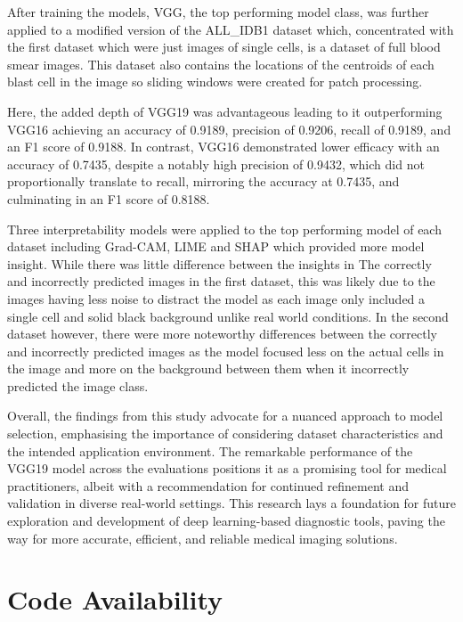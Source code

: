 \documentclass[
	a4paper,
	10pt,
	unnumberedsections,
	twoside,
]{research_article}
\begin{document}
After training the models, VGG, the top performing model class, was further applied to a modified version of the ALL\_IDB1 dataset which, concentrated with the first dataset which were just images of single cells, is a dataset of full blood smear images. This dataset also contains the locations of the centroids of each blast cell in the image so sliding windows were created for patch processing.

Here, the added depth of VGG19 was advantageous leading to it outperforming VGG16 achieving an accuracy of 0.9189, precision of 0.9206, recall of 0.9189, and an F1 score of 0.9188. In contrast, VGG16 demonstrated lower efficacy with an accuracy of 0.7435, despite a notably high precision of 0.9432, which did not proportionally translate to recall, mirroring the accuracy at 0.7435, and culminating in an F1 score of 0.8188. 

Three interpretability models were applied to the top performing model of each dataset including Grad-CAM, LIME and SHAP which provided more model insight. While there was little difference between the insights in The correctly and incorrectly predicted images in the first dataset, this was likely due to the images having less noise to distract the model as each image only included a single cell and solid black background unlike real world conditions. In the second dataset however, there were more noteworthy differences between the correctly and incorrectly predicted images as the model focused less on the actual cells in the image and more on the background between them when it incorrectly predicted the image class.

Overall, the findings from this study advocate for a nuanced approach to model selection, emphasising the importance of considering dataset characteristics and the intended application environment. The remarkable performance of the VGG19 model across the evaluations positions it as a promising tool for medical practitioners, albeit with a recommendation for continued refinement and validation in diverse real-world settings. This research lays a foundation for future exploration and development of deep learning-based diagnostic tools, paving the way for more accurate, efficient, and reliable medical imaging solutions.


\section{Code Availability}
\end{document}
